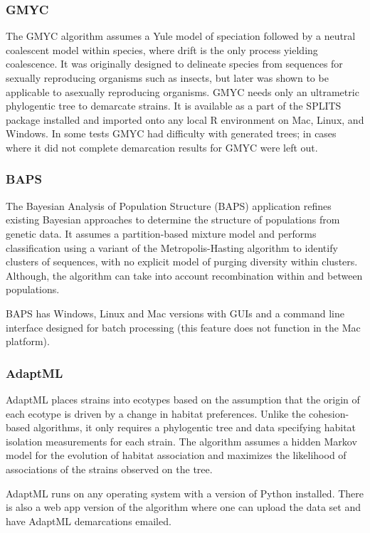 \subsubsection*{GMYC~\cite{barraclough2009inferring}}
The GMYC algorithm assumes a Yule model of speciation followed by a neutral coalescent model within species, where drift is the only process yielding coalescence.
It was originally designed to delineate species from sequences for sexually reproducing organisms such as insects, but later was shown to be applicable to asexually reproducing organisms.
GMYC needs only an ultrametric phylogentic tree to demarcate strains.
It is available as a part of the SPLITS package installed and imported onto any local R environment on Mac, Linux, and Windows.
In some tests GMYC had difficulty with generated trees; in cases where it did not complete demarcation results for GMYC were left out.

\subsubsection*{BAPS~\cite{corander2007bayesian}}
The Bayesian Analysis of Population Structure (BAPS) application refines existing Bayesian approaches to determine the structure of populations from genetic data.
It assumes a partition-based mixture model and performs classification using a variant of the Metropolis-Hasting algorithm to identify clusters of sequences, with no explicit model of purging diversity within clusters.
Although, the algorithm can take into account recombination within and between populations.

BAPS has Windows, Linux and Mac versions with GUIs and a command line interface designed for batch processing (this feature does not function in the Mac platform).

\subsubsection*{AdaptML~\cite{hunt2008resource}}
AdaptML places strains into ecotypes based on the assumption that the origin of each ecotype is driven by a change in habitat preferences.
Unlike the cohesion-based algorithms, it only requires a phylogentic tree and data specifying habitat isolation measurements for each strain.
The algorithm assumes a hidden Markov model for the evolution of habitat association and maximizes the likelihood of associations of the strains observed on the tree.

AdaptML runs on any operating system with a  version of Python installed. There is also a web app version of the algorithm where one can upload the data set and have AdaptML demarcations emailed.

